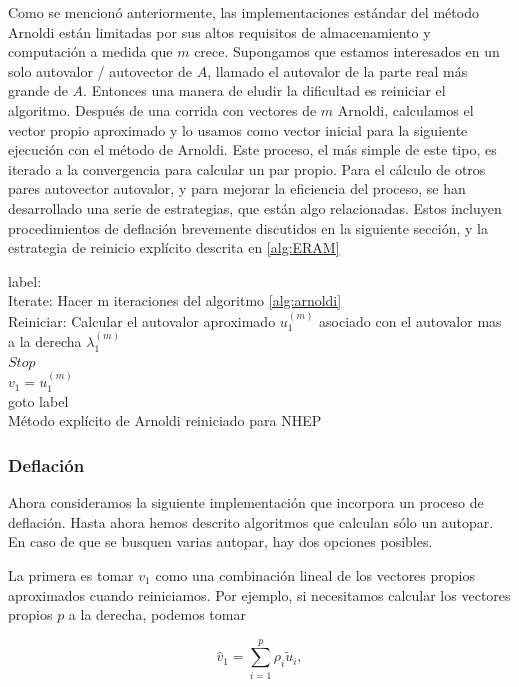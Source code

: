 \documentclass[a4paper,openright,12pt, oneside]{book}
\begin{document}
Como se mencion\'o anteriormente, las implementaciones est\'andar del m\'etodo Arnoldi est\'an limitadas por sus altos requisitos de almacenamiento y computaci\'on a medida que $ m $ crece. Supongamos que estamos interesados en un solo autovalor / autovector de $ A $, llamado el autovalor de la parte real m\'as grande de $ A $. Entonces una manera de eludir la dificultad es reiniciar el algoritmo. Despu\'es de una corrida con vectores de $ m $ Arnoldi, calculamos el vector propio aproximado y lo usamos como vector inicial para la siguiente ejecuci\'on con el m\'etodo de Arnoldi. Este proceso, el m\'as simple de este tipo, es iterado a la convergencia para calcular un par propio. Para el c\'alculo de otros pares autovector autovalor, y para mejorar la eficiencia del proceso, se han desarrollado una serie de estrategias, que est\'an algo relacionadas. Estos incluyen procedimientos de deflaci\'on brevemente discutidos en la siguiente secci\'on, y la estrategia de reinicio expl\'icito descrita en \ref{alg:ERAM}

\begin{algorithm}
    \label{alg:ERAM}
    label:\\
    Iterate: Hacer m iteraciones del algoritmo \ref{alg:arnoldi}\\
    Reiniciar: Calcular el autovalor aproximado $u_1^{(m)}$ asociado con el autovalor mas a la derecha 
    $\lambda_1^{(m)}$\\
     {
        $Stop$ \\
    }
    $v_1 = u_1^{(m)}$\\
    goto label\\
    \caption{M\'etodo expl\'icito de Arnoldi reiniciado para NHEP}
\end{algorithm}

 \subsubsection{Deflaci\'on}

 Ahora consideramos la siguiente implementaci\'on que incorpora un proceso de deflaci\'on. Hasta ahora hemos descrito algoritmos que calculan s\'olo un autopar. En caso de que se busquen varias autopar, hay dos opciones posibles.

La primera es tomar $ v_1 $ como una combinaci\'on lineal de los vectores propios aproximados cuando reiniciamos. Por ejemplo, si necesitamos calcular los vectores propios $ p $ a la derecha, podemos tomar

\begin{displaymath}\hat v_1 = \sum_{i=1}^p \rho_i \tilde u_i, \end{displaymath}
\end{document}
